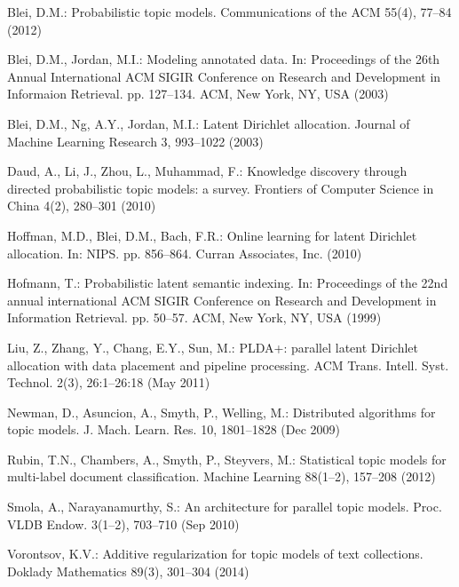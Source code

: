 \documentclass[russian,english]{llncs}
\begin{document}
\begin{thebibliography}{10}

Blei, D.M.: Probabilistic topic models. Communications of the ACM  55(4),
  77--84 (2012)

Blei, D.M., Jordan, M.I.: Modeling annotated data. In: Proceedings of the 26th
  Annual International ACM SIGIR Conference on Research and Development in
  Informaion Retrieval. pp. 127--134. ACM, New York, NY, USA (2003)

Blei, D.M., Ng, A.Y., Jordan, M.I.: Latent {Dirichlet} allocation. Journal of
  Machine Learning Research  3,  993--1022 (2003)

Daud, A., Li, J., Zhou, L., Muhammad, F.: Knowledge discovery through directed
  probabilistic topic models: a survey. Frontiers of Computer Science in China
  4(2),  280--301 (2010)

Hoffman, M.D., Blei, D.M., Bach, F.R.: Online learning for latent Dirichlet
  allocation. In: NIPS. pp. 856--864. Curran Associates, Inc. (2010)

Hofmann, T.: Probabilistic latent semantic indexing. In: Proceedings of the
  22nd annual international ACM SIGIR Conference on Research and Development in
  Information Retrieval. pp. 50--57. ACM, New York, NY, USA (1999)

Liu, Z., Zhang, Y., Chang, E.Y., Sun, M.: {PLDA+:} parallel latent {D}irichlet
  allocation with data placement and pipeline processing. ACM Trans. Intell.
  Syst. Technol.  2(3),  26:1--26:18 (May 2011)

Newman, D., Asuncion, A., Smyth, P., Welling, M.: Distributed algorithms for
  topic models. J. Mach. Learn. Res.  10,  1801--1828 (Dec 2009)

Rubin, T.N., Chambers, A., Smyth, P., Steyvers, M.: 
  Statistical topic models for multi-label document classification. 
  Machine Learning  88(1--2),  157--208
  (2012)

Smola, A., Narayanamurthy, S.: An architecture for parallel topic models. 
    Proc. VLDB Endow.  3(1--2),  703--710 (Sep 2010)

Vorontsov, K.V.: Additive regularization for topic models of text collections.
  Doklady Mathematics  89(3),  301--304 (2014)


\end{thebibliography}
\end{document}
